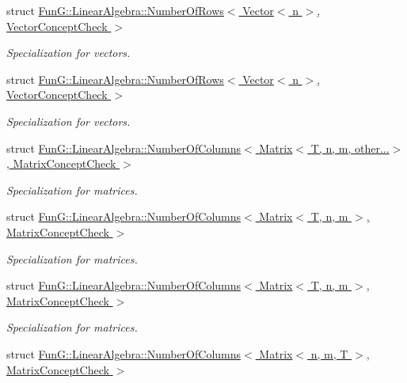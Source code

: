\begin{DoxyCompactItemize}
struct \hyperlink{structFunG_1_1LinearAlgebra_1_1NumberOfRows_3_01Vector_3_01n_01_4_00_01VectorConceptCheck_01_4}{\-Fun\-G\-::\-Linear\-Algebra\-::\-Number\-Of\-Rows$<$ Vector$<$ n $>$, Vector\-Concept\-Check $>$}
\begin{DoxyCompactList}\small\item\em \-Specialization for vectors. \end{DoxyCompactList}\item 
struct \hyperlink{structFunG_1_1LinearAlgebra_1_1NumberOfRows_3_01Vector_3_01n_01_4_00_01VectorConceptCheck_01_4}{\-Fun\-G\-::\-Linear\-Algebra\-::\-Number\-Of\-Rows$<$ Vector$<$ n $>$, Vector\-Concept\-Check $>$}
\begin{DoxyCompactList}\small\item\em \-Specialization for vectors. \end{DoxyCompactList}\item 
struct \hyperlink{structFunG_1_1LinearAlgebra_1_1NumberOfColumns_3_01Matrix_3_01T_00_01n_00_01m_00_01other_8_8_8_4_00_01MatrixConceptCheck_01_4}{\-Fun\-G\-::\-Linear\-Algebra\-::\-Number\-Of\-Columns$<$ Matrix$<$ T, n, m, other...$>$, Matrix\-Concept\-Check $>$}
\begin{DoxyCompactList}\small\item\em \-Specialization for matrices. \end{DoxyCompactList}\item 
struct \hyperlink{structFunG_1_1LinearAlgebra_1_1NumberOfColumns_3_01Matrix_3_01T_00_01n_00_01m_01_4_00_01MatrixConceptCheck_01_4}{\-Fun\-G\-::\-Linear\-Algebra\-::\-Number\-Of\-Columns$<$ Matrix$<$ T, n, m $>$, Matrix\-Concept\-Check $>$}
\begin{DoxyCompactList}\small\item\em \-Specialization for matrices. \end{DoxyCompactList}\item 
struct \hyperlink{structFunG_1_1LinearAlgebra_1_1NumberOfColumns_3_01Matrix_3_01T_00_01n_00_01m_01_4_00_01MatrixConceptCheck_01_4}{\-Fun\-G\-::\-Linear\-Algebra\-::\-Number\-Of\-Columns$<$ Matrix$<$ T, n, m $>$, Matrix\-Concept\-Check $>$}
\begin{DoxyCompactList}\small\item\em \-Specialization for matrices. \end{DoxyCompactList}\item 
struct \hyperlink{structFunG_1_1LinearAlgebra_1_1NumberOfColumns_3_01Matrix_3_01n_00_01m_00_01T_01_4_00_01MatrixConceptCheck_01_4}{\-Fun\-G\-::\-Linear\-Algebra\-::\-Number\-Of\-Columns$<$ Matrix$<$ n, m, T $>$, Matrix\-Concept\-Check $>$}

\end{DoxyCompactItemize}
